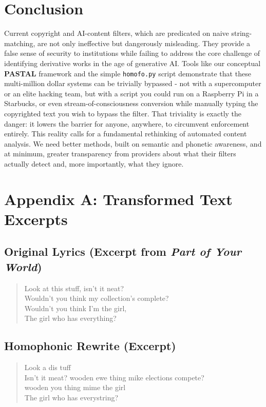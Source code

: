 \documentclass[12pt]{article}
\begin{document}
\section{Conclusion}
Current copyright and AI-content filters, which are predicated on naive string-matching, are not only ineffective but dangerously misleading. They provide a false sense of security to institutions while failing to address the core challenge of identifying derivative works in the age of generative AI. Tools like our conceptual \textbf{PASTAL} framework and the simple \texttt{homofo.py} script demonstrate that these multi-million dollar systems can be trivially bypassed - not with a supercomputer or an elite hacking team, but with a script you could run on a Raspberry Pi in a Starbucks, or even stream-of-consciousness conversion while manually typing the copyrighted text you wish to bypass the filter. That triviality is exactly the danger: it lowers the barrier for anyone, anywhere, to circumvent enforcement entirely.  This reality calls for a fundamental rethinking of automated content analysis. We need better methods, built on semantic and phonetic awareness, and at minimum, greater transparency from providers about what their filters actually detect and, more importantly, what they ignore.

\appendix
\section{Appendix A: Transformed Text Excerpts}
\subsection{Original Lyrics (Excerpt from \emph{Part of Your World})}
\begin{quote}
Look at this stuff, isn't it neat? \\
Wouldn't you think my collection's complete? \\
Wouldn't you think I'm the girl, \\
The girl who has everything?
\end{quote}

\subsection{Homophonic Rewrite (Excerpt)}
\begin{quote}
Look a dis tuff \\
Isn't it meat? wooden ewe thing mike elections compete? \\
wooden you thing mime the girl \\
The girl who has everystring?
\end{quote}
\end{document}
